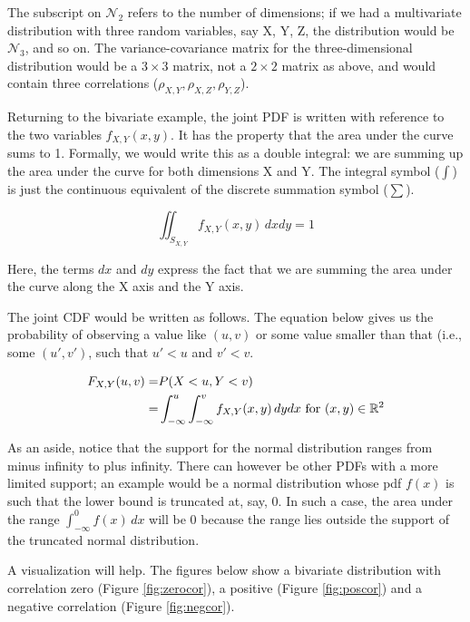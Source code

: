 \documentclass[12pt,]{krantz}
\begin{document}
The subscript on \(\mathcal{N}_2\) refers to the number of dimensions; if we had a multivariate distribution with three random variables, say X, Y, Z, the distribution would be \(\mathcal{N}_3\), and so on. The variance-covariance matrix for the three-dimensional distribution would be a \(3\times 3\) matrix, not a \(2\times 2\) matrix as above, and would contain three correlations (\(\rho_{X,Y},\rho_{X,Z},\rho_{Y,Z}\)).

Returning to the bivariate example, the joint PDF is written with reference to the two variables \(f_{X,Y}(x,y)\). It has the property that the area under the curve sums to 1. Formally, we would write this as a double integral: we are summing up the area under the curve for both dimensions X and Y. The integral symbol (\(\int\)) is just the continuous equivalent of the discrete summation symbol (\(\sum\)).

\begin{equation}
\iint_{S_{X,Y}} f_{X,Y}(x,y)\, dx dy = 1
\end{equation}

Here, the terms \(dx\) and \(dy\) express the fact that we are summing the area under the curve along the X axis and the Y axis.

The joint CDF would be written as follows. The equation below gives us the probability of observing a value like \((u,v)\) or some value smaller than that (i.e., some \((u',v')\), such that \(u'<u\) and \(v'<v\).

\begin{equation}
\begin{split}
F_{X,Y}(u,v) =& P(X<u,Y<v)\\
             =& \int_{-\infty}^u \int_{-\infty}^v f_{X,Y}(x,y)\, dy dx \hbox{ for } (x,y)\in \mathbb{R}^2\\
\end{split}
\end{equation}

As an aside, notice that the support for the normal distribution ranges from minus infinity to plus infinity. There can however be other PDFs with a more limited support; an example would be a normal distribution whose pdf \(f(x)\) is such that the lower bound is truncated at, say, 0. In such a case, the area under the range \(\int_{-\infty}^0 f(x) \, dx\) will be 0 because the range lies outside the support of the truncated normal distribution.

A visualization will help. The figures below show a bivariate distribution with correlation zero (Figure \ref{fig:zerocor}), a positive (Figure \ref{fig:poscor}) and a negative correlation (Figure \ref{fig:negcor}).
\end{document}
